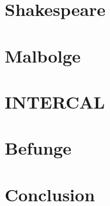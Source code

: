 \documentclass{sig-alternate}
\begin{document}


\newpage
\section{Shakespeare}



\newpage
\section{Malbolge}



\newpage
\section{INTERCAL}



\newpage
\section{Befunge}



\newpage

\section{Conclusion}

\blindtext[4]

\printbibliography
\end{document}
